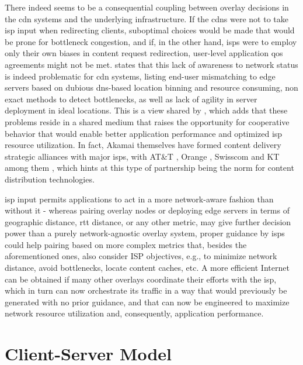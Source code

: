     There indeed seems to be a consequential coupling between overlay decisions in the \gls{cdn} systems and the underlying infrastructure.
    If the \glspl{cdn} were not to take \gls{isp} input when redirecting clients, suboptimal choices would be made that would be prone for bottleneck congestion, and if, in the other hand, \glspl{isp} were to employ only their own biases in content request redirection, user-level application \gls{qos} agreements might not be met.
        \cite{pushing-cdn-isp-collaboration} states that this lack of awareness to network status is indeed problematic for \gls{cdn} systems, listing end-user mismatching to edge servers based on dubious \gls{dns}-based location binning and resource consuming, non exact methods to detect bottlenecks, as well as lack of agility in server deployment in ideal locations.
        This is a view shared by \cite{cdn-isp-cooperations}, which adds that these problems reside in a shared medium that raises the opportunity for cooperative behavior that would enable better application performance and optimized \gls{isp} resource utilization.
    In fact, Akamai themselves have formed content delivery strategic alliances with major \glspl{isp}, with AT\&T \cite{att}, Orange \cite{orange}, Swisscom \cite{swisscom} and KT \cite {kt} among them \cite{pushing-cdn-isp-collaboration}, which hints at this type of partnership being the norm for content distribution technologies.

        \gls{isp} input permits applications to act in a more network-aware fashion than without it - whereas pairing overlay nodes or deploying edge servers in terms of geographic distance, \gls{rtt} distance, or any other metric, may give further decision power than a purely network-agnostic overlay system, proper guidance by \glspl{isp} could help pairing based on more complex metrics that, besides the aforementioned ones, also consider ISP objectives, e.g., to minimize network distance, avoid bottlenecks, locate content caches, etc.
        A more efficient Internet can be obtained if many other overlays coordinate their efforts with the \gls{isp}, which in turn can now orchestrate its traffic in a way that would previously be generated with no prior guidance, and that can now be engineered to maximize network resource utilization and, consequently, application performance.

\section{Client-Server Model}

